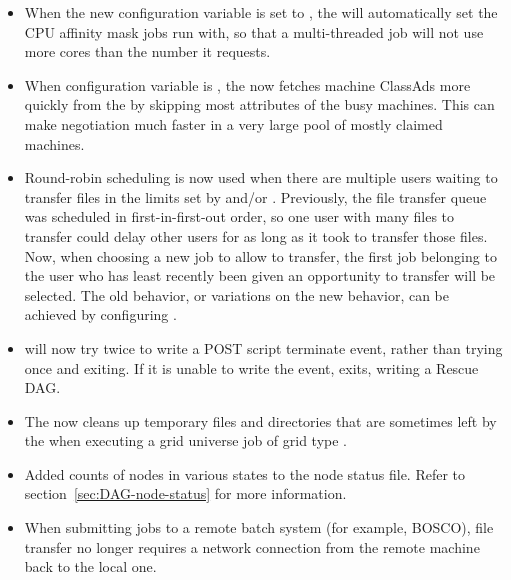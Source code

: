 \begin{itemize}

\item When the new configuration variable 
is set to , 
the  will automatically set the CPU affinity
mask jobs run with, so that a multi-threaded job will not use
more cores than the number it requests.

\item When configuration variable 
is , the 
now fetches machine ClassAds more quickly from the 
 by skipping most attributes of the busy machines.  
This can make negotiation much faster in
a very large pool of mostly claimed machines.

\item Round-robin scheduling is now used when there are multiple users
waiting to transfer files in the limits set by
 and/or
.  Previously, the file transfer
queue was scheduled in first-in-first-out order, so one user with
many files to transfer could delay other users for as long as it took
to transfer those files.  Now, when choosing a new job to allow to
transfer, the first job belonging to the user who has least
recently been given an opportunity to transfer will be selected.
The old behavior, or variations on the new behavior, can be achieved
by configuring .

\item {} will now try twice to write a POST script terminate
event, rather than trying once and exiting. 
If it is unable to write the event,  exits, 
writing a Rescue DAG. 

\item The  now cleans up temporary files and directories
that are sometimes left by the  when executing a grid
universe job of grid type .

\item Added counts of nodes in various states to the 
node status file.  Refer to section~\ref{sec:DAG-node-status} for
more information.

\item When submitting jobs to a remote batch system (for example, BOSCO),
file transfer no longer requires a network connection from the remote machine
back to the local one.

\end{itemize}


